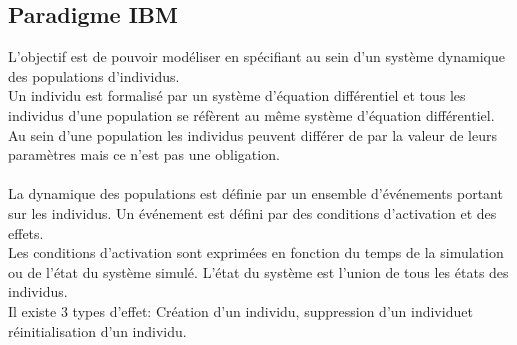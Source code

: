 \subsection{Paradigme IBM}
L'objectif est de pouvoir modéliser en spécifiant au sein d'un système dynamique des populations d'individus.\\
Un individu est formalisé par un système d'équation différentiel et tous les individus d'une population se réfèrent au même système d'équation différentiel.\\
Au sein d'une population les individus peuvent différer de par la valeur de leurs paramètres mais ce n'est pas une obligation.\\
\\
La dynamique des populations est définie par un ensemble d’événements portant sur les individus. Un événement est défini par des conditions d'activation et des effets.\\
Les conditions d'activation sont exprimées en fonction du temps de la simulation ou de l'état du système simulé. L'état du système est l'union de tous les états des individus.\\
Il existe 3 types d'effet: Création d'un individu, suppression d'un individuet réinitialisation d'un individu.


